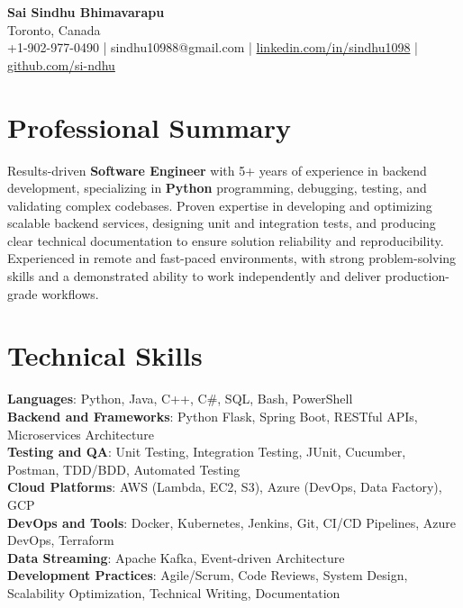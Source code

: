 \documentclass[letterpaper,11pt]{article}
\begin{document}
\begin{center}
  {\Large \textbf{Sai Sindhu Bhimavarapu}} \\
  Toronto, Canada \\
  +1-902-977-0490 \enspace | \enspace sindhu10988@gmail.com \enspace | \enspace \href{https://www.linkedin.com/in/sindhu1098/}{linkedin.com/in/sindhu1098} \enspace | \enspace \href{https://github.com/si-ndhu}{github.com/si-ndhu}
\end{center}

\section{Professional Summary}
  \begin{itemize}[leftmargin=0.15in, label={}]
    \small{\item{
     Results-driven \textbf{Software Engineer} with 5+ years of experience in backend development, specializing in \textbf{Python} programming, debugging, testing, and validating complex codebases. Proven expertise in developing and optimizing scalable backend services, designing unit and integration tests, and producing clear technical documentation to ensure solution reliability and reproducibility. Experienced in remote and fast-paced environments, with strong problem-solving skills and a demonstrated ability to work independently and deliver production-grade workflows.
    }}
  \end{itemize}
\vspace{-16pt}

\section{Technical Skills}
 \begin{itemize}[leftmargin=0.15in, label={}]
    \small{\item{
     \textbf{Languages}: Python, Java, C++, C\#, SQL, Bash, PowerShell \\
     \textbf{Backend and Frameworks}: Python Flask, Spring Boot, RESTful APIs, Microservices Architecture \\
     \textbf{Testing and QA}: Unit Testing, Integration Testing, JUnit, Cucumber, Postman, TDD/BDD, Automated Testing \\
     \textbf{Cloud Platforms}: AWS (Lambda, EC2, S3), Azure (DevOps, Data Factory), GCP \\
     \textbf{DevOps and Tools}: Docker, Kubernetes, Jenkins, Git, CI/CD Pipelines, Azure DevOps, Terraform \\
     \textbf{Data Streaming}: Apache Kafka, Event-driven Architecture \\
     \textbf{Development Practices}: Agile/Scrum, Code Reviews, System Design, Scalability Optimization, Technical Writing, Documentation
    }}
 \end{itemize}
\vspace{-16pt}
\end{document}
